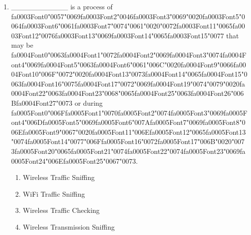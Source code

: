 \documentclass[12pt]{article}
\begin{document}
\begin{enumerate}[label=\arabic*.]
\item \_\_\_\_\_\_\_\_\_\_\_ is a process of {\csname fa0003Font0\endcsname\char"0057}{\char"0069}{\csname fa0003Font2\endcsname\char"0046}{\csname fa0003Font3\endcsname\char"0069}{\char"0020}{\csname fa0003Font5\endcsname\char"0064}{\csname fa0003Font6\endcsname\char"0061}{\csname fa0003Font7\endcsname\char"0074}{\char"0061}{\char"0020}{\char"0072}{\csname fa0003Font11\endcsname\char"0065}{\csname fa0003Font12\endcsname\char"0076}{\csname fa0003Font13\endcsname\char"0069}{\csname fa0003Font14\endcsname\char"0065}{\csname fa0003Font15\endcsname\char"0077} that may be {\csname fa0004Font0\endcsname\char"0063}{\csname fa0004Font1\endcsname\char"0072}{\csname fa0004Font2\endcsname\char"0069}{\csname fa0004Font3\endcsname\char"0074}{\csname fa0004Font4\endcsname\char"0069}{\csname fa0004Font5\endcsname\char"0063}{\csname fa0004Font6\endcsname\char"0061}{\char"006C}{\char"0020}{\csname fa0004Font9\endcsname\char"0066}{\csname fa0004Font10\endcsname\char"006F}{\char"0072}{\char"0020}{\csname fa0004Font13\endcsname\char"0073}{\csname fa0004Font14\endcsname\char"0065}{\csname fa0004Font15\endcsname\char"0063}{\csname fa0004Font16\endcsname\char"0075}{\csname fa0004Font17\endcsname\char"0072}{\char"0069}{\csname fa0004Font19\endcsname\char"0074}{\char"0079}{\char"0020}{\csname fa0004Font22\endcsname\char"0063}{\csname fa0004Font23\endcsname\char"0068}{\char"0065}{\csname fa0004Font25\endcsname\char"0063}{\csname fa0004Font26\endcsname\char"006B}{\csname fa0004Font27\endcsname\char"0073} or during {\csname fa0005Font0\endcsname\char"006F}{\csname fa0005Font1\endcsname\char"0070}{\csname fa0005Font2\endcsname\char"0074}{\csname fa0005Font3\endcsname\char"0069}{\csname fa0005Font4\endcsname\char"006D}{\csname fa0005Font5\endcsname\char"0069}{\csname fa0005Font6\endcsname\char"007A}{\csname fa0005Font7\endcsname\char"0069}{\csname fa0005Font8\endcsname\char"006E}{\csname fa0005Font9\endcsname\char"0067}{\char"0020}{\csname fa0005Font11\endcsname\char"006E}{\csname fa0005Font12\endcsname\char"0065}{\csname fa0005Font13\endcsname\char"0074}{\csname fa0005Font14\endcsname\char"0077}{\char"006F}{\csname fa0005Font16\endcsname\char"0072}{\csname fa0005Font17\endcsname\char"006B}{\char"0020}{\char"0073}{\csname fa0005Font20\endcsname\char"0065}{\csname fa0005Font21\endcsname\char"0074}{\csname fa0005Font22\endcsname\char"0074}{\csname fa0005Font23\endcsname\char"0069}{\csname fa0005Font24\endcsname\char"006E}{\csname fa0005Font25\endcsname\char"0067}{\char"0073}.
\begin{enumerate}[label=(\alph*)]
    \item Wireless Traffic Sniffing
    \item WiFi Traffic Sniffing
    \item Wireless Traffic Checking
    \item Wireless Transmission Sniffing
\end{enumerate}
\end{enumerate}
\end{document}
